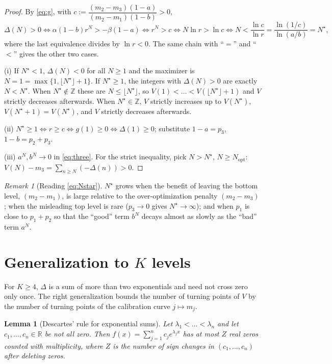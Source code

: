 \documentclass[11pt]{article}
\newtheorem{lemma}{Lemma}
\theoremstyle{definition}
\theoremstyle{remark}
\newtheorem{remark}{Remark}
\begin{document}
\begin{proof}
By \eqref{eq:g}, with $c:=\dfrac{(m_2-m_3)(1-a)}{(m_2-m_1)(1-b)}>0$,
\[
\Delta(N)>0\iff \alpha(1-b)r^{N}>-\beta(1-a)\iff r^{N}>c\iff N\ln r>\ln c
\iff N<\frac{\ln c}{\ln r}=\frac{\ln(1/c)}{\ln(a/b)}=N^\star,
\]
where the last equivalence divides by $\ln r<0$. The same chain with ``$=$'' and ``$<$''
gives the other two cases.

(i) If $N^\star<1$, $\Delta(N)<0$ for all $N\ge 1$ and the maximizer is $N=1=\max\{1,\lfloor N^\star\rfloor+1\}$.
If $N^\star\ge1$, the integers with $\Delta(N)>0$ are exactly $N<N^\star$.
When $N^\star\notin\mathbb Z$ these are $N\le\lfloor N^\star\rfloor$, so $V(1)<\dots<V(\lfloor N^\star\rfloor+1)$
and $V$ strictly decreases afterwards. When $N^\star\in\mathbb Z$, $V$ strictly increases up to
$V(N^\star)$, $V(N^\star+1)=V(N^\star)$, and $V$ strictly decreases afterwards.

(ii) $N^\star\ge1\iff r\ge c\iff g(1)\ge 0\iff\Delta(1)\ge0$; substitute $1-a=p_3$, $1-b=p_2+p_3$.

(iii) $a^N,b^N\to0$ in \eqref{eq:three}. For the strict inequality, pick $N>N^\star$, $N\ge N_{\mathrm{opt}}$:
$V(N)-m_3=\sum_{n\ge N}(-\Delta(n))>0$.
\end{proof}

\begin{remark}[Reading \eqref{eq:Nstar}]
$N^\star$ grows when the benefit of leaving the bottom level, $(m_2-m_1)$, is large relative
to the over-optimization penalty $(m_2-m_3)$; when the misleading top level is rare
($p_3\to0$ gives $N^\star\to\infty$); and when $p_1$ is close to $p_1+p_2$ so that the
``good'' term $b^N$ decays almost as slowly as the ``bad'' term $a^N$.
\end{remark}

\section{Generalization to $K$ levels}

For $K\ge4$, $\Delta$ is a sum of more than two exponentials and need not cross zero only
once. The right generalization bounds the number of turning points of $V$ by the number of
turning points of the calibration curve $j\mapsto m_j$.

\begin{lemma}[Descartes' rule for exponential sums]\label{lem:desc}
Let $\lambda_1<\dots<\lambda_n$ and let $c_1,\dots,c_n\in\mathbb R$ be not all zero. Then
$f(x)=\sum_{j=1}^n c_j e^{\lambda_j x}$ has at most $Z$ real zeros counted with multiplicity,
where $Z$ is the number of sign changes in $(c_1,\dots,c_n)$ after deleting zeros.
\end{lemma}
\end{document}
